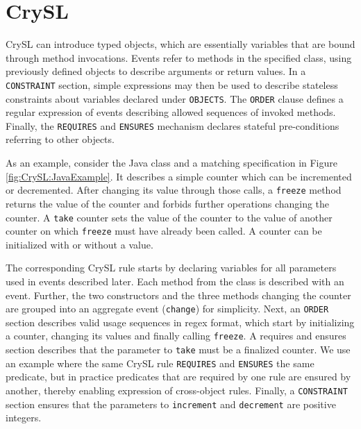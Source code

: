 \documentclass{article}
\begin{document}
\section{CrySL}
\label{sec:CrySL}
CrySL can introduce typed objects, which are essentially variables that are bound through method invocations.
Events refer to methods in the specified class, using previously defined objects to describe arguments or return values.
In a \texttt{CONSTRAINT} section, simple expressions may then be used to describe stateless constraints about variables declared under \texttt{OBJECTS}.
The \texttt{ORDER} clause defines a regular expression of events describing allowed sequences of invoked methods.
Finally, the \texttt{REQUIRES} and \texttt{ENSURES} mechanism declares stateful pre-conditions referring to other objects.

As an example, consider the Java class and a matching specification in Figure \ref{fig:CrySL:JavaExample}.
It describes a simple counter which can be incremented or decremented. 
After changing its value through those calls, a \texttt{freeze} method returns the value of the counter and forbids
further operations changing the counter.
A \texttt{take} counter sets the value of the counter to the value of another counter on which \texttt{freeze} must
have already been called.
A counter can be initialized with or without a value.

The corresponding CrySL rule starts by declaring variables for all parameters used in events described later.
Each method from the class is described with an event. Further, the two constructors and the three methods changing
the counter are grouped into an aggregate event (\texttt{change}) for simplicity.
Next, an \texttt{ORDER} section describes valid usage sequences in regex format, which start by initializing a counter, changing its
values and finally calling \texttt{freeze}.
 A requires and ensures section describes that
the parameter to \texttt{take} must be a finalized counter. We use an example where the same CrySL rule \texttt{REQUIRES} and \texttt{ENSURES} the same predicate, but in practice predicates that are required by one rule are ensured by another, thereby enabling expression of cross-object rules.
Finally, a \texttt{CONSTRAINT} section ensures that the parameters to \texttt{increment} and \texttt{decrement} are
positive integers.
\end{document}
